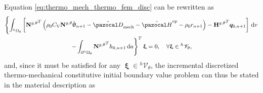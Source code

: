 Equation \eqref{eq:thermo_mech_thermo_fem_disc} can be rewritten as
\begin{multline}
  \left\{\int_{^h\Omega_0}   \left[{\mathbf N^{g,\theta}}^T \left(\rho_0C_\mathrm{V}\mathbf N^{g,\theta}\dot{\bm \uptheta}_{n+1} -\hat{\pazocal D}_\text{mech} - \hat{\pazocal H}^\text{ep}- \rho_0 r_{n+1} \right) - {\mathbf H^{g,\theta}}^T\bm q_{0,n+1} \right]\ud v\right. \\ \left.- \int_{\partial{}^h\Omega_0} {\mathbf N^{g,\theta}}^T h_{0,n+1}\ud a\right\}^T \bm \upxi= 0,\quad \forall \bm{\upxi} \in {}^h\mathscr{V}_{\theta}, \label{eq:thermo_mech_thermo_fem_disc}
\end{multline}
and, since it must be satisfied for any $\bm \upxi \in {}^h \mathscr{V}_\theta$, the incremental discretized thermo-mechanical constitutive initial boundary value problem can thus be stated in the material description as
